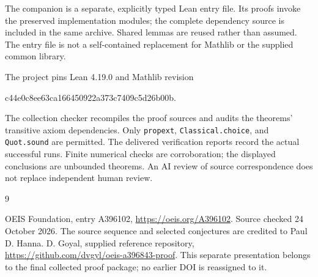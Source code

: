 \documentclass[11pt,a4paper]{article}
\theoremstyle{remark}
\begin{document}
The companion is a separate, explicitly typed Lean entry file. Its proofs
invoke the preserved implementation modules; the complete dependency source
is included in the same archive. Shared lemmas are reused rather than
assumed. The entry file is not a self-contained replacement for Mathlib or
the supplied common library.

The project pins Lean 4.19.0 and Mathlib revision
\begin{center}\small\ttfamily
c44e0c8ee63ca166450922a373c7409c5d26b00b.
\end{center}
The collection checker recompiles the proof sources and audits the
theorems' transitive axiom dependencies. Only \texttt{propext},
\texttt{Classical.choice}, and \texttt{Quot.sound} are permitted.
The delivered verification reports record the actual successful runs.
Finite numerical checks are corroboration; the displayed conclusions are
unbounded theorems. An AI review of source correspondence does not replace
independent human review.
\begin{thebibliography}{9}
\raggedright
{} OEIS Foundation, entry A396102,
\url{https://oeis.org/A396102}. Source checked 24 October 2026.
The source sequence and selected conjectures are credited to Paul D. Hanna.
 D. Goyal, supplied reference repository,
\url{https://github.com/dvgyl/oeis-a396843-proof}.
This separate presentation belongs to the final collected proof package;
no earlier DOI is reassigned to it.
\end{thebibliography}
\end{document}
